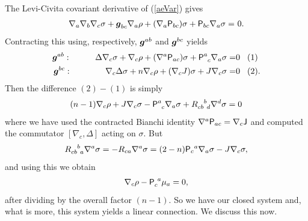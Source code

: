 \documentclass[a4paper,12pt]{amsart}
\newcommand{\V}{\mbox{\sf P}}
\newcommand{\J}{\mbox{\sf J}}
\def\bg{\mbox{\boldmath $g$}}
\theoremstyle{remark}
\newcommand{\nn}[1]{(\ref{#1})}
\begin{document}
The Levi-Civita covariant derivative of \nn{aeVar} gives
\begin{equation}\nonumber
\begin{split}
\nabla_a\nabla_b\nabla_c \sigma+\bg_{bc}\nabla_a\rho+
(\nabla_a \V_{bc})\sigma+\V_{bc}\nabla_a\sigma=& ~0 .\\
\end{split}
\end{equation}
Contracting this using, respectively, $\bg^{ab}$ and $\bg^{bc}$ yields
 \begin{equation}\nonumber
\begin{split}
\bg^{ab}:\hspace{10mm}\Delta\nabla_c\sigma+\nabla_c\rho+
(\nabla^a \V_{ac})\sigma+\V^{a}_{\phantom{a}c}\nabla_a\sigma=& 
0 \hspace{3mm}(1)\\
\bg^{bc}:\hspace{14mm}\nabla_c\Delta\sigma+n\nabla_c\rho+
(\nabla_c J)\sigma+J\nabla_c\sigma=& 0\hspace{3mm} (2).\\
\end{split}
\end{equation}
Then the difference $(2)-(1)$ is simply 
$$
(n-1) \nabla_c\rho+J\nabla_c\sigma-\V^a_{\phantom{a}c}\nabla_a\sigma+
R_{cb\phantom{b}d}^{\phantom{cb}b}\nabla^d\sigma=0
$$ where we have used the contracted Bianchi identity $\nabla^a
 \V_{ac}=\nabla_c \J$ and computed the commutator $[\nabla_c,\Delta]$
 acting on $\sigma$. But 
$$
R_{cb\phantom{b}a}^{\phantom{cb}b}\nabla^a\sigma=-R_{ca}\nabla^{a}\sigma
=(2-n)\V_c{}^a\nabla_a\sigma-J\nabla_c\sigma ,
$$
and using this we obtain
\begin{equation}\label{rhoeq}
\nabla_c\rho- \V_c^{\phantom{c}a}\mu_a=0,
\end{equation}
after dividing by the overall factor $(n-1)$.  So we have our closed
system and, what is more, this system yields a linear connection. We
discuss this now.
\end{document}
